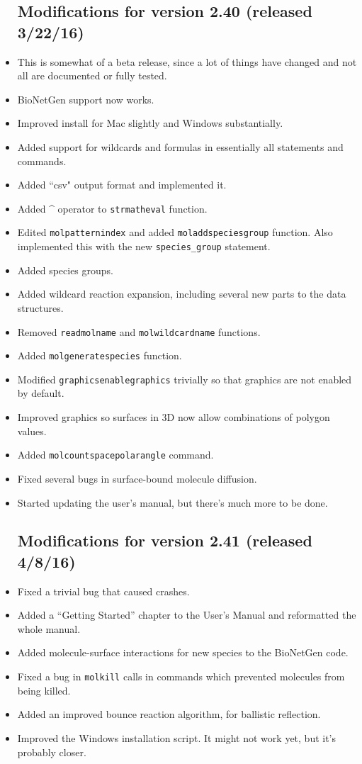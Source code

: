 \documentclass {scrbook}
\newcommand {\ttt} {\texttt}
\begin{document}
\begin{itemize}
\subsection{Modifications for version 2.40 (released 3/22/16)}
\item This is somewhat of a beta release, since a lot of things have changed and not all are documented or fully tested.
\item BioNetGen support now works.
\item Improved install for Mac slightly and Windows substantially.
\item Added support for wildcards and formulas in essentially all statements and commands.
\item Added ``csv" output format and implemented it.
\item Added \^{} operator to \ttt{strmatheval} function.
\item Edited \ttt{molpatternindex} and added \ttt{moladdspeciesgroup} function. Also implemented this with the new \ttt{species\_group} statement.
\item Added species groups.
\item Added wildcard reaction expansion, including several new parts to the data structures.
\item Removed \ttt{readmolname} and \ttt{molwildcardname} functions.
\item Added \ttt{molgeneratespecies} function.
\item Modified \ttt{graphicsenablegraphics} trivially so that graphics are not enabled by default.
\item Improved graphics so surfaces in 3D now allow combinations of polygon values.
\item Added \ttt{molcountspacepolarangle} command.
\item Fixed several bugs in surface-bound molecule diffusion.
\item Started updating the user's manual, but there's much more to be done.

\subsection{Modifications for version 2.41 (released 4/8/16)}
\item Fixed a trivial bug that caused crashes.
\item Added a ``Getting Started'' chapter to the User's Manual and reformatted the whole manual.
\item Added molecule-surface interactions for new species to the BioNetGen code.
\item Fixed a bug in \ttt{molkill} calls in commands which prevented molecules from being killed.
\item Added an improved bounce reaction algorithm, for ballistic reflection.
\item Improved the Windows installation script. It might not work yet, but it's probably closer.


\end{itemize}
\end{document}
